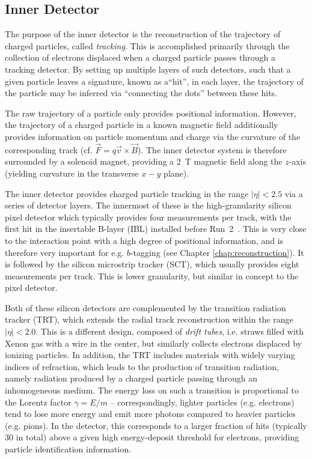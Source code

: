 \subsection{Inner Detector}
The purpose of the inner detector is the reconstruction of the trajectory of charged particles, called 
\emph{tracking}. This is accomplished primarily through the collection of electrons displaced when a 
charged particle passes through a tracking detector. By setting up multiple layers of such detectors, 
such that a given particle leaves a signature, known as a``hit'', in each layer, the trajectory of 
the particle may be inferred via ``connecting the dots'' between these hits.

The raw trajectory of a particle only provides positional information. However, the trajectory 
of a charged particle in a known magnetic field additionally provides information on particle 
momentum and charge via the curvature of the corresponding track (cf. $\vec{F} = q\vec{v}\times \vec{B}$).
The inner detector system is therefore surrounded by a solenoid magnet, providing a \SI{2}{\tesla} magnetic 
field along the $z$-axis (yielding curvature in the transverse $x-y$ plane).

The inner detector provides charged particle tracking in the range \(|\eta| < 2.5\) via a series of 
detector layers. The innermost of these is
the high-granularity silicon pixel detector which typically provides four measurements per track, with the 
first hit in the insertable B-layer (IBL) installed before Run~2~\cite{ATLAS-TDR-19,PIX-2018-001}. This 
is very close to the interaction point with a high degree of positional information, and is therefore 
very important for e.g. $b$-tagging (see Chapter \ref{chap:reconstruction}). It is followed by the silicon 
microstrip tracker (SCT), which usually provides eight measurements per track. This is lower granularity, but 
similar in concept to the pixel detector.

Both of these silicon detectors are complemented by the transition radiation tracker (TRT),
which extends the radial track reconstruction within the range \(|\eta| < 2.0\). This is a different 
design, composed of \emph{drift tubes}, i.e. straws filled with Xenon gas with a wire in the center, 
but similarly collects electrons displaced by ionizing particles. In addition, the TRT includes materials 
with widely varying indices of refraction, which leads to the production of transition radiation, namely 
radiation produced by a charged particle passing through an inhomogeneous medium. The energy loss on 
such a transition is proportional to the Lorentz factor $\gamma = E/m$ -- correspondingly, lighter 
particles (e.g. electrons) tend to lose more energy and emit more photons compared to heavier particles 
(e.g. pions). In the detector, this corresponds to a larger fraction of hits (typically 30 in total) above a 
given high energy-deposit threshold for electrons, providing particle identification information.

